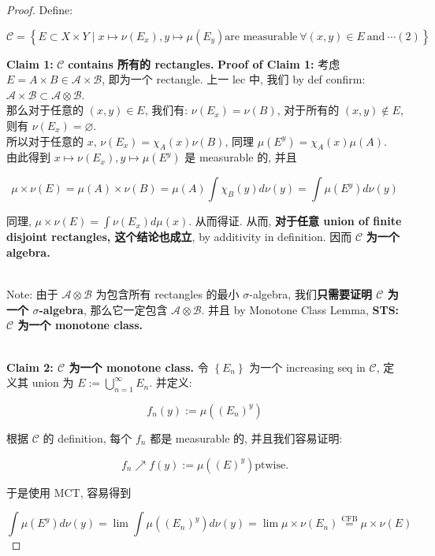 \begin{proof}

Define:

\[\mathcal{C} = \left\{ {E \subset X \times Y \mid x\mapsto\nu(E_{x}),y\mapsto\mu(E_{y})\text{are measurable}\ \forall(x,y) \in E\ \text{and}\ \cdots(2)} \right\}\]

\textbf{Claim 1:} \(\mathcal{C}\) \textbf{contains 所有的 rectangles.} \textbf{Proof of Claim 1:} 考虑 \(E = A \times B \in \mathcal{A} \times \mathcal{B}\), 即为一个 rectangle. 上一 lec 中, 我们 by def confirm: \(\mathcal{A} \times \mathcal{B} \subset \mathcal{A} \otimes \mathcal{B}\).\\
那么对于任意的 \((x,y) \in E\), 我们有: \(\nu(E_{x}) = \nu(B)\), 对于所有的 \((x,y) \notin E\), 则有 \(\nu(E_{x}) = \varnothing\).\\
所以对于任意的 \(x\), \(\nu(E_{x}) = \chi_{A}(x)\nu(B)\), 同理 \(\mu(E^{y}) = \chi_{A}(x)\mu(A)\).\\
由此得到 \(x\mapsto\nu(E_{x}),y\mapsto\mu(E^{y})\) 是 measurable 的, 并且

\[\mu \times \nu(E) = \mu(A) \times \nu(B) = \mu(A)\int\chi_{B}(y) d\nu(y) = \int\mu(E^{y}) d\nu(y)\]

同理, \(\mu \times \nu(E) = \int\nu(E_{x}) d\mu(x)\). 从而得证. 从而, \textbf{对于任意 union of finite disjoint rectangles, 这个结论也成立}, by additivity in definition. 因而 \(\mathcal{C}\) \textbf{为一个 algebra.}\\
\strut \\
Note: 由于 \(\mathcal{A} \otimes \mathcal{B}\) 为包含所有 rectangles 的最小 \(\sigma\)-algebra, 我们\textbf{只需要证明 \(\mathcal{C}\) 为一个 \(\sigma\)-algebra}, 那么它一定包含 \(\mathcal{A} \otimes \mathcal{B}\). 并且 by Monotone Class Lemma, \textbf{STS: \(\mathcal{C}\) 为一个 monotone class.}\\
\strut \\
\textbf{Claim 2: \(\mathcal{C}\) 为一个 monotone class.} 令 \(\left\{ E_{n} \right\}\) 为一个 increasing seq in \(\mathcal{C}\), 定义其 union 为 \(E := \bigcup_{n = 1}^{\infty}E_{n}\). 并定义:

\[f_{n}(y) := \mu((E_{n})^{y})\]

根据 \(\mathcal{C}\) 的 definition, 每个 \(f_{n}\) 都是 measurable 的, 并且我们容易证明:

\[f_{n}\operatorname{\nearrow }f(y) := \mu((E)^{y})\text{ptwise.}\]

于是使用 MCT, 容易得到

\[\int\mu(E^{y}) d\nu(y) = \lim\int\mu((E_{n})^{y}) d\nu(y) = \lim\mu \times \nu(E_{n})\overset{\text{CFB}}{=}\mu \times \nu(E)\]


\end{proof}
